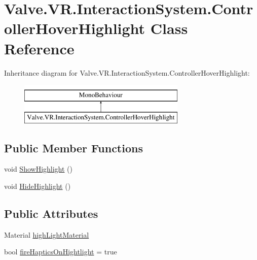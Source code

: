 \hypertarget{class_valve_1_1_v_r_1_1_interaction_system_1_1_controller_hover_highlight}{}\section{Valve.\+V\+R.\+Interaction\+System.\+Controller\+Hover\+Highlight Class Reference}
\label{class_valve_1_1_v_r_1_1_interaction_system_1_1_controller_hover_highlight}
Inheritance diagram for Valve.\+V\+R.\+Interaction\+System.\+Controller\+Hover\+Highlight\+:\begin{figure}[H]
\begin{center}
\leavevmode
\includegraphics[height=2.000000cm]{class_valve_1_1_v_r_1_1_interaction_system_1_1_controller_hover_highlight}
\end{center}
\end{figure}
\subsection*{Public Member Functions}
\begin{DoxyCompactItemize}
\item 
void \mbox{\hyperlink{class_valve_1_1_v_r_1_1_interaction_system_1_1_controller_hover_highlight_a37112472e300ddb5666632f0d5a01608}{Show\+Highlight}} ()
\item 
void \mbox{\hyperlink{class_valve_1_1_v_r_1_1_interaction_system_1_1_controller_hover_highlight_ac784326189805638d152cda9314105c9}{Hide\+Highlight}} ()
\end{DoxyCompactItemize}
\subsection*{Public Attributes}
\begin{DoxyCompactItemize}
\item 
Material \mbox{\hyperlink{class_valve_1_1_v_r_1_1_interaction_system_1_1_controller_hover_highlight_a2bfe22496d798dc95d70f715a5425d9d}{high\+Light\+Material}}
\item 
bool \mbox{\hyperlink{class_valve_1_1_v_r_1_1_interaction_system_1_1_controller_hover_highlight_a93486865334727e380d04173562498a2}{fire\+Haptics\+On\+Hightlight}} = true
\end{DoxyCompactItemize}
